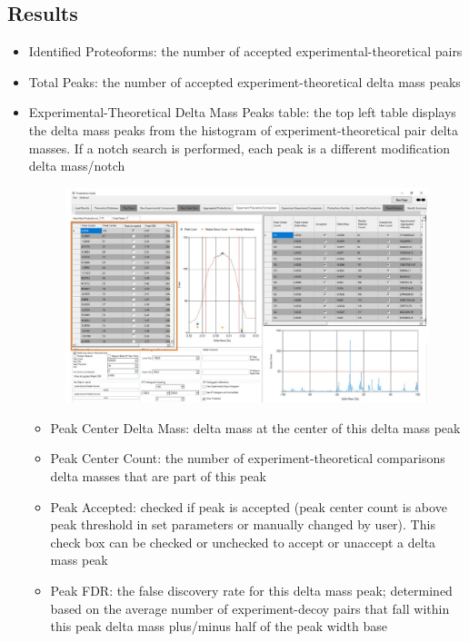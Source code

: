 \subsection{Results}
\begin{itemize}
	\item Identified Proteoforms: the number of accepted experimental-theoretical pairs
	\item Total Peaks: the number of accepted experiment-theoretical delta mass peaks
	\pagebreak
	\item Experimental-Theoretical Delta Mass Peaks table: the top left table displays the delta mass peaks from the histogram of experiment-theoretical pair delta masses. If a notch search is performed, each peak is a different modification delta mass/notch

	\begin{figure}[h]
\centering
\includegraphics[scale=0.46]{figures/et2.jpg}
\end{figure}
	\begin{itemize}
		\item Peak Center Delta Mass: delta mass at the center of this delta mass peak 
		\item Peak Center Count: the number of experiment-theoretical comparisons delta masses that are part of this peak
		\item Peak Accepted: checked if peak is accepted (peak center count is above peak threshold in set parameters or manually changed by user). This check box can be checked or unchecked to accept or unaccept a delta mass peak
		\item Peak FDR: the false discovery rate for this delta mass peak; determined based on the average number of experiment-decoy pairs that fall within this peak delta mass plus/minus half of the peak width base

\end{itemize}
\end{itemize}
